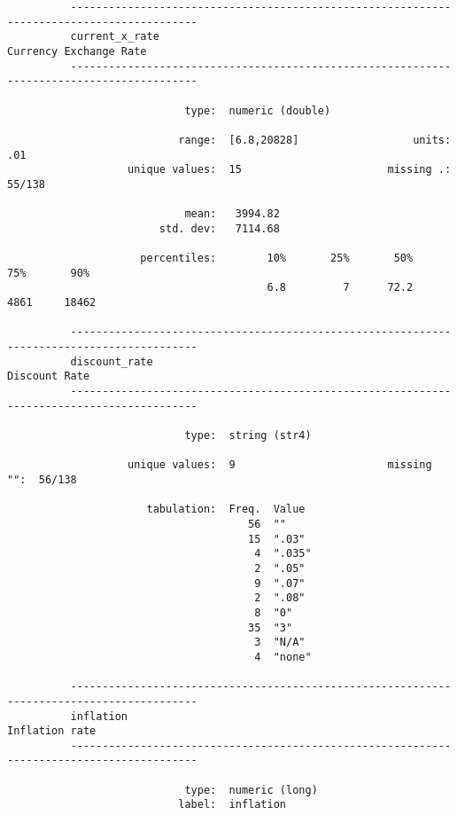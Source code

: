 \documentclass{article}
\begin{document}
\begin{verbatim}
          ------------------------------------------------------------------------------------------
          current_x_rate                                                      Currency Exchange Rate
          ------------------------------------------------------------------------------------------
          
                            type:  numeric (double)
          
                           range:  [6.8,20828]                  units:  .01
                   unique values:  15                       missing .:  55/138
          
                            mean:   3994.82
                        std. dev:   7114.68
          
                     percentiles:        10%       25%       50%       75%       90%
                                         6.8         7      72.2      4861     18462
          
          ------------------------------------------------------------------------------------------
          discount_rate                                                                Discount Rate
          ------------------------------------------------------------------------------------------
          
                            type:  string (str4)
          
                   unique values:  9                        missing "":  56/138
          
                      tabulation:  Freq.  Value
                                      56  ""
                                      15  ".03"
                                       4  ".035"
                                       2  ".05"
                                       9  ".07"
                                       2  ".08"
                                       8  "0"
                                      35  "3"
                                       3  "N/A"
                                       4  "none"
          
          ------------------------------------------------------------------------------------------
          inflation                                                                   Inflation rate
          ------------------------------------------------------------------------------------------
          
                            type:  numeric (long)
                           label:  inflation
          

\end{verbatim}
\end{document}
